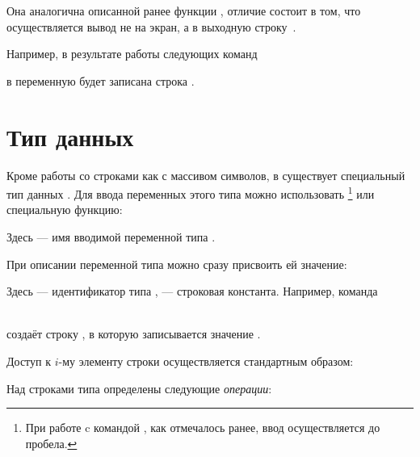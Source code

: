 
Она аналогична описанной ранее функции , отличие состоит в том, что осуществляется вывод не на
экран, а в выходную строку~.

Например, в результате работы следующих команд



в переменную  будет записана строка .

\section[Тип данных \Sys{string}]{Тип данных }\label{ch08:3}
Кроме работы со строками как с массивом символов, в  существует специальный тип данных .
Для ввода переменных этого типа можно использовать \footnote{При работе c командой
, как отмечалось ранее, ввод осуществляется до пробела.} или специальную функцию:


Здесь  --- имя вводимой переменной типа .

При описании переменной типа  можно сразу присвоить ей значение:


Здесь  --- идентификатор типа ,  --- строковая
константа. Например, команда

\\
создаёт строку , в которую записывается значение .

Доступ к $i$-му элементу строки осуществляется стандартным образом:


Над строками типа  определены следующие \emph{операции}:

